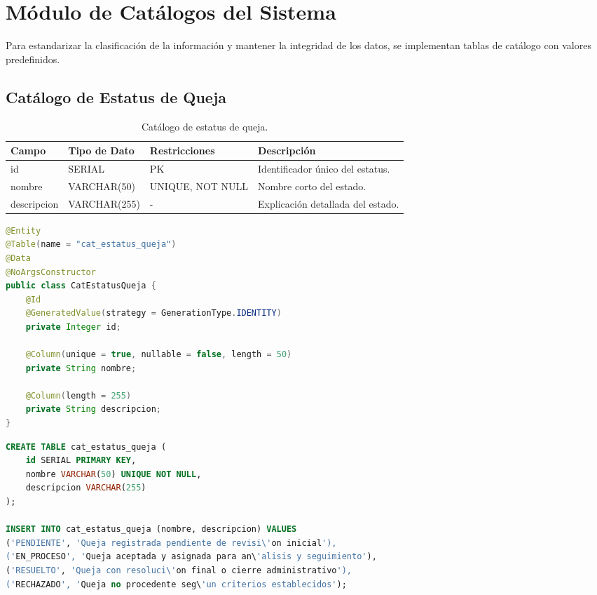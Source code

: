 \section{M\'odulo de Cat\'alogos del Sistema}
Para estandarizar la clasificaci\'on de la informaci\'on y mantener la integridad de los datos, se implementan tablas de cat\'alogo con valores predefinidos.

\subsection{Cat\'alogo de Estatus de Queja}

\begin{table}[H]
\centering
\small
\begin{tabularx}{\textwidth}{|l|l|l|X|}
\hline
\rowcolor{azulESCOM} 
\color{white}\textbf{Campo} & \color{white}\textbf{Tipo de Dato} & \color{white}\textbf{Restricciones} & \color{white}\textbf{Descripci\'on} \\ \hline
id & SERIAL & PK & Identificador \'unico del estatus. \\ \hline
nombre & VARCHAR(50) & UNIQUE, NOT NULL & Nombre corto del estado. \\ \hline
descripcion & VARCHAR(255) & - & Explicaci\'on detallada del estado. \\ \hline
\end{tabularx}
\caption{Cat\'alogo de estatus de queja.}
\label{tab:dict_cat_estatus}
\end{table}

\begin{lstlisting}[language=Java, caption={Entidad Java para cat\'alogo de estatus.}, label={lst:java_cat_estatus}]
@Entity
@Table(name = "cat_estatus_queja")
@Data
@NoArgsConstructor
public class CatEstatusQueja {
    @Id
    @GeneratedValue(strategy = GenerationType.IDENTITY)
    private Integer id;
    
    @Column(unique = true, nullable = false, length = 50)
    private String nombre;
    
    @Column(length = 255)
    private String descripcion;
}
\end{lstlisting}

\begin{lstlisting}[language=SQL, caption={Script de creaci\'on e inicializaci\'on del cat\'alogo de estatus.}, label={lst:sql_cat_estatus}]
CREATE TABLE cat_estatus_queja (
    id SERIAL PRIMARY KEY,
    nombre VARCHAR(50) UNIQUE NOT NULL,
    descripcion VARCHAR(255)
);

INSERT INTO cat_estatus_queja (nombre, descripcion) VALUES 
('PENDIENTE', 'Queja registrada pendiente de revisi\'on inicial'),
('EN_PROCESO', 'Queja aceptada y asignada para an\'alisis y seguimiento'),
('RESUELTO', 'Queja con resoluci\'on final o cierre administrativo'),
('RECHAZADO', 'Queja no procedente seg\'un criterios establecidos');
\end{lstlisting}

